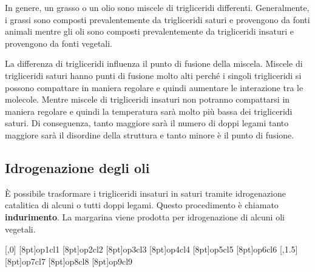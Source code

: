 In genere, un grasso o un olio sono miscele di trigliceridi differenti. Generalmente, i grassi sono composti prevalentemente da trigliceridi saturi e provengono da fonti animali mentre gli oli sono composti prevalentemente da trigliceridi insaturi e provengono da fonti vegetali.

La differenza di trigliceridi influenza il punto di fusione della miscela. Miscele di trigliceridi saturi hanno punti di fusione molto alti perché i singoli trigliceridi si possono compattare in maniera regolare e quindi aumentare le interazione tra le molecole. Mentre miscele di trigliceridi insaturi non potranno compattarsi in maniera regolare e quindi la temperatura sarà molto più bassa dei trigliceridi saturi. Di conseguenza, tanto maggiore sarà il numero di doppi legami tanto maggiore sarà il disordine della struttura e tanto minore è il punto di fusione.

\subsection{Idrogenazione degli oli}
È possibile trasformare i trigliceridi insaturi in saturi tramite idrogenazione catalitica di alcuni o tutti doppi legami. Questo procedimento è chiamato \textbf{indurimento}. La margarina viene prodotta per idrogenazione di alcuni oli vegetali.
\chemnameinit{}
\begin{reaction}
	[,0]
	\makepolymerdelims[delimiters=(),subscript=$\scriptstyle \!3$]{2pt}[8pt]{op1}{cl1}
	\makepolymerdelims[delimiters=(),subscript=$\scriptstyle \!3$]{2pt}[8pt]{op2}{cl2}
	\makepolymerdelims[delimiters=(),subscript=$\scriptstyle \!3$]{2pt}[8pt]{op3}{cl3}
	\makepolymerdelims[delimiters=(),subscript=$\scriptstyle \!3$]{2pt}[8pt]{op4}{cl4}
	\makepolymerdelims[delimiters=(),subscript=$\scriptstyle \!3$]{2pt}[8pt]{op5}{cl5}
	\makepolymerdelims[delimiters=(),subscript=$\scriptstyle \!3$]{2pt}[8pt]{op6}{cl6}
	\arrow{->[3 \ch{H2}][cat. \ch{Ni}]}[,1.5]
	\makepolymerdelims[delimiters=(),subscript=$\scriptstyle \!8$]{2pt}[8pt]{op7}{cl7}
	\makepolymerdelims[delimiters=(),subscript=$\scriptstyle \!8$]{2pt}[8pt]{op8}{cl8}
	\makepolymerdelims[delimiters=(),subscript=$\scriptstyle \!8$]{2pt}[8pt]{op9}{cl9}
\end{reaction}
\chemnameinit{}

